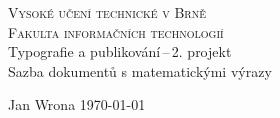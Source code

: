 \begin{titlepage}
\begin{center}
\textsc{{\LARGE Vysoké učení technické v Brně}\\
\smallskip
{\Large Fakulta informačních technologií}}\\
{\LARGE Typografie a publikování\,--\,2. projekt}\\
\medskip
{\Huge Sazba dokumentů s matematickými výrazy}\\
\end{center}
{\Large Jan Wrona \hfill \today}
\end{titlepage}
